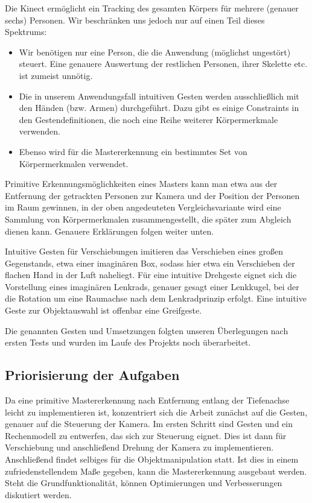 	Die Kinect ermöglicht ein Tracking des gesamten Körpers für mehrere (genauer sechs) Personen. Wir beschränken uns jedoch nur auf einen Teil dieses Spektrums:
	\begin{itemize}
		\item Wir benötigen nur eine Person, die die Anwendung (möglichst ungestört) steuert. Eine genauere Auswertung der restlichen Personen, ihrer Skelette etc. ist zumeist unnötig.
		\item Die in unserem Anwendungsfall intuitiven Gesten werden ausschließlich mit den Händen (bzw. Armen) durchgeführt. Dazu gibt es einige Constraints in den Gestendefinitionen, die noch eine Reihe weiterer Körpermerkmale verwenden.
		\item Ebenso wird für die Mastererkennung ein bestimmtes Set von Körpermerkmalen verwendet.
	\end{itemize}
	Primitive Erkennungsmöglichkeiten eines Masters kann man etwa aus der Entfernung der getrackten Personen zur Kamera und der Position der Personen im Raum gewinnen, in der oben angedeuteten Vergleichsvariante wird eine Sammlung von Körpermerkmalen zusammengestellt, die später zum Abgleich dienen kann. Genauere Erklärungen folgen weiter unten.\par 
	Intuitive Gesten für Verschiebungen imitieren das Verschieben eines großen Gegenstands, etwa einer imaginären Box, sodass hier etwa ein Verschieben der flachen Hand in der Luft naheliegt. Für eine intuitive Drehgeste eignet sich die Vorstellung eines imaginären Lenkrads, genauer gesagt einer Lenkkugel, bei der die Rotation um eine Raumachse nach dem Lenkradprinzip erfolgt. Eine intuitive Geste zur Objektauswahl ist offenbar eine Greifgeste.\par 
	Die genannten Gesten und Umsetzungen folgten unseren Überlegungen nach ersten Tests und wurden im Laufe des Projekts noch überarbeitet.
	\subsection{Priorisierung der Aufgaben}
	Da eine primitive Mastererkennung nach Entfernung entlang der Tiefenachse leicht zu implementieren ist, konzentriert sich die Arbeit zunächst auf die Gesten, genauer auf die Steuerung der Kamera. Im ersten Schritt sind Gesten und ein Rechenmodell zu entwerfen, das sich zur Steuerung eignet. Dies ist dann für Verschiebung und anschließend Drehung der Kamera zu implementieren. Anschließend findet selbiges für die Objektmanipulation statt. Ist dies in einem zufriedenstellendem Maße gegeben, kann die Mastererkennung ausgebaut werden. Steht die Grundfunktionalität, können Optimierungen und Verbesserungen diskutiert werden.
